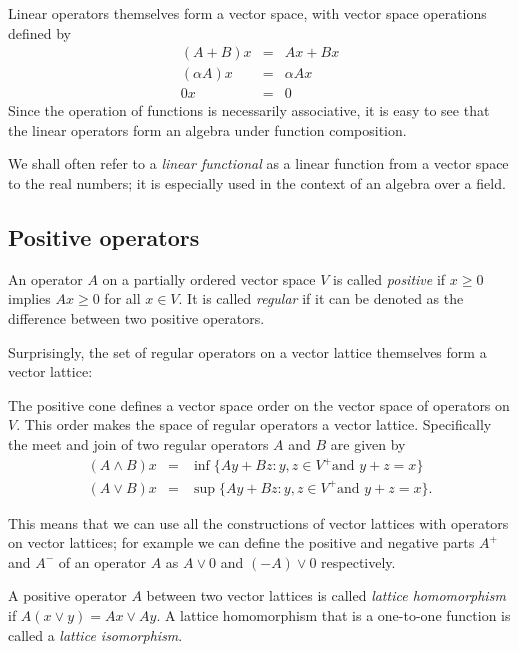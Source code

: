 Linear operators themselves form a vector space, with vector space operations defined by
\begin{eqnarray*}
(A + B)x&=&Ax + Bx\\
(\alpha A)x&=&\alpha Ax\\
0x&=&0
\end{eqnarray*}
Since the operation of functions is necessarily associative, it is easy to see that the linear operators form an algebra under function composition.

We shall often refer to a \emph{linear functional}  as  a linear function from a vector space to the real numbers; it is especially used in the context of an algebra over a field.

\subsection{Positive operators}
\label{positive-operators}

\begin{defn}
An operator $A$ on a partially ordered vector space $V$ is called \emph{positive} if $x \ge 0$ implies $Ax \ge 0$ for all $x\in V$. It is called \emph{regular} if it can be denoted as the difference between two positive operators.
\end{defn}

Surprisingly, the set of regular operators on a vector lattice themselves form a vector lattice:
\begin{prop}
The positive cone defines a vector space order on the vector space of operators on $V$. This order makes the space of regular operators a vector lattice. Specifically the meet and join of two regular operators $A$ and $B$ are given by
\begin{eqnarray*}
(A \land B)x & = & \inf\{Ay + Bz : y,z \in V^+ \text{and } y + z = x\}\\
(A \lor B)x & = & \sup\{Ay + Bz : y,z \in V^+ \text{and } y + z = x\}.
\end{eqnarray*}
\end{prop}

This means that we can use all the constructions of vector lattices with operators on vector lattices; for example we can define the positive and negative parts $A^+$ and $A^-$ of an operator $A$ as $A\lor 0$ and $(-A)\lor 0$ respectively.

\begin{defn}
A positive operator $A$ between two vector lattices is called \emph{lattice homomorphism} if $A(x \lor y) = Ax \lor Ay$. A lattice homomorphism that is a one-to-one function is called a \emph{lattice isomorphism}.
\end{defn}

